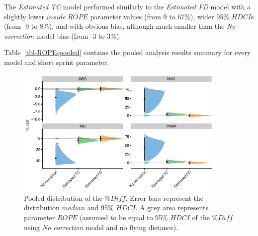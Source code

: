 \documentclass[
  letterpaper,
  DIV=11,
  numbers=noendperiod]{scrartcl}
\begin{document}
The \emph{Estimated TC} model performed similarly to the \emph{Estimated
FD} model with a slightly lower \(inside \; ROPE\) parameter values
(from 9 to 67\%), wider 95\% \(HDCI\)s (from -9 to 8\%), and with
obvious bias, although much smaller than the \emph{No correction} model
bias (from -3 to 3\%).

Table~\ref{tbl-ROPE-pooled} contains the pooled analysis results summary
for every model and short sprint parameter.

\begin{figure}

{\centering \includegraphics[width=0.9\textwidth,height=\textheight]{shorts-simulation-paper_files/figure-pdf/fig-graph-ROPE-pooled-1.pdf}

}

\caption{\label{fig-graph-ROPE-pooled}Pooled distribution of the
\(\%Diff\). Error bars represent the distribution \(median\) and 95\%
\(HDCI\). A grey area represents parameter \(ROPE\) (assumed to be equal
to 95\% \(HDCI\) of the \(\%Diff\) using \emph{No correction} model and
no flying distance).}

\end{figure}
\end{document}

